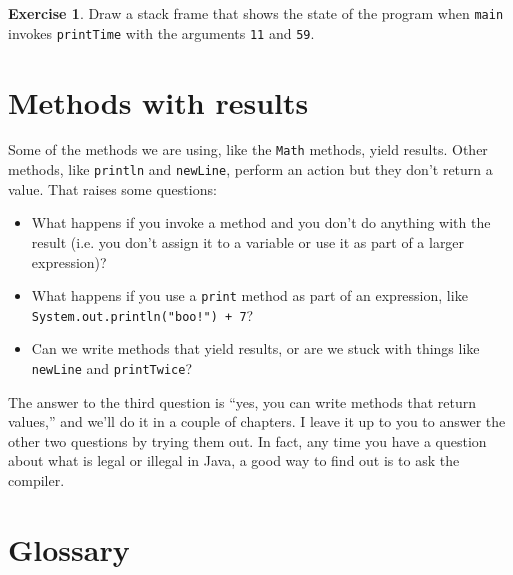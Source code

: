 \documentclass[12pt]{book}
\theoremstyle{definition}
\newtheorem{excz}{Exercise}[chapter]
\newenvironment{exercise}{\bigskip\begin{excz}\mbox{}}{\end{excz}}
\begin{document}
\begin{exercise}

Draw a stack frame that shows the state of the program
when {\tt main} invokes {\tt printTime}
with the arguments {\tt 11} and {\tt 59}.

\end{exercise}


\section {Methods with results}

Some of the methods we are using,
like the {\tt Math} methods, yield results.  Other methods,
like {\tt println} and {\tt newLine}, perform an action but
they don't return a value.  That raises some questions:

\begin{itemize}

\item What happens if you invoke a method and you don't
do anything with the result (i.e. you don't assign it to
a variable or use it as part of a larger expression)?

\item What happens if you use a {\tt print} method as part
of an expression, like {\tt System.out.println("boo!") + 7}?

\item Can we write methods that yield results, or are we
stuck with things like {\tt newLine} and {\tt printTwice}?

\end{itemize}

The answer to the third question is ``yes, you can write methods that
return values,'' and we'll do it in a couple of chapters.  I
leave it up to you to answer the other two questions by trying them
out.  In fact, any time you have a question about what is legal or
illegal in Java, a good way to find out is to ask the compiler.


\section{Glossary}
\end{document}
